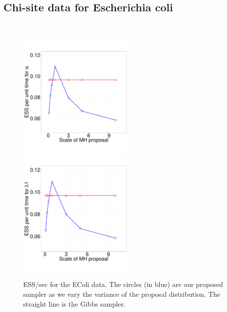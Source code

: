 {  \subsection{Chi-site data for Escherichia coli}~
  \begin{figure}%
    \vspace{-.2in}
  \centering
  \begin{minipage}[!hp]{.24\linewidth}
    \caption{ESS/sec for the EColi data. The circles (in blue) are our 
      proposed sampler as we vary the variance of the proposal distribution. 
      The straight line is the Gibbs sampler. }
     \label{fig:ECOLI}
  \end{minipage}
  \begin{minipage}[!hp]{.01\linewidth}
    \hspace{.1in}
  \end{minipage}
  \begin{minipage}[!hp]{.7\linewidth}
    \includegraphics [width=0.5\textwidth, angle=0]{figs/ECOLI_alpha.pdf}
    \includegraphics [width=0.5\textwidth, angle=0]{figs/ECOLI_l1.pdf}

\end{minipage}
\end{figure}}
